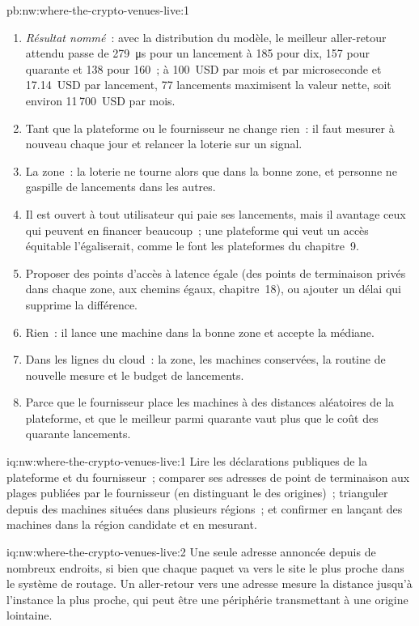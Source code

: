 \begin{solution}{pb:nw:where-the-crypto-venues-live:1}
\begin{enumerate}[resume]
\item \emph{Résultat nommé}~: avec la distribution du modèle, le meilleur aller-retour attendu passe de \qty{279}{\micro\second} pour un lancement à 185 pour dix,
  157 pour quarante et 138 pour 160~; à 100~USD par mois et par microseconde et 17.14~USD par lancement, 77 lancements maximisent la valeur nette, soit environ 11\,700~USD par mois.
\item Tant que la plateforme ou le fournisseur ne change rien~: il faut mesurer à nouveau chaque jour et relancer la loterie sur un signal.
\item La zone~: la loterie ne tourne alors que dans la bonne zone, et personne ne gaspille de lancements dans les autres.
\item Il est ouvert à tout utilisateur qui paie ses lancements, mais il avantage ceux qui peuvent en financer beaucoup~; une plateforme qui veut un accès équitable
  l'égaliserait, comme le font les plateformes du chapitre~9.
\item Proposer des points d'accès à latence égale (des points de terminaison privés dans chaque zone, aux chemins égaux, chapitre~18), ou ajouter un délai qui supprime la différence.
\item Rien~: il lance une machine dans la bonne zone et accepte la médiane.
\item Dans les lignes du cloud~: la zone, les machines conservées, la routine de nouvelle mesure et le budget de lancements.
\item Parce que le fournisseur place les machines à des distances aléatoires de la plateforme, et que le meilleur parmi quarante vaut plus que le coût des quarante lancements.
\end{enumerate}
\end{solution}

\begin{solution}{iq:nw:where-the-crypto-venues-live:1}
Lire les déclarations publiques de la plateforme et du fournisseur~; comparer ses adresses de point de terminaison aux plages publiées par le fournisseur
(en distinguant le  des origines)~; trianguler depuis des machines situées dans plusieurs régions~; et confirmer en lançant des machines dans la région candidate et en mesurant.
\end{solution}

\begin{solution}{iq:nw:where-the-crypto-venues-live:2}
Une seule adresse annoncée depuis de nombreux endroits, si bien que chaque paquet va vers le site le plus proche dans le système de routage. Un aller-retour vers une adresse  mesure la
distance jusqu'à l'instance la plus proche, qui peut être une périphérie transmettant à une origine lointaine.
\end{solution}

